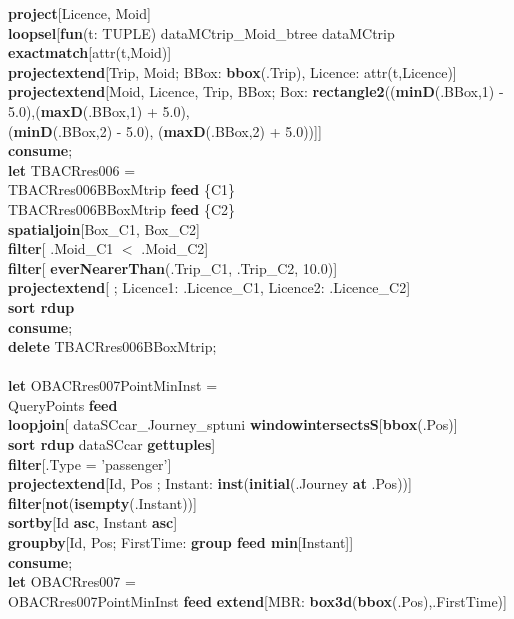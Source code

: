 \documentclass[a4paper]{article}
\newcommand{\op}[1]{\textbf{#1}}
\begin{document}
\begin{scriptsize}
\begin{tabbing}
\>\op{project}[Licence, Moid]\\
\>\op{loopsel}[\op{fun}(t: TUPLE) dataMCtrip\_Moid\_btree dataMCtrip \op{exactmatch}[attr(t,Moid)]\\
\>\>\op{projectextend}[Trip, Moid; BBox: \op{bbox}(.Trip), Licence: attr(t,Licence)]\\
\>\>\op{projectextend}[Moid, Licence, Trip, BBox; Box: \op{rectangle2}((\op{minD}(.BBox,1) - 5.0),(\op{maxD}(.BBox,1) + 5.0),\\
\>\>\>\>(\op{minD}(.BBox,2) - 5.0), (\op{maxD}(.BBox,2) + 5.0))]]\\
\op{consume};\\
\op{let} TBACRres006 =\\
\>TBACRres006BBoxMtrip \op{feed} \{C1\}\\
\>TBACRres006BBoxMtrip \op{feed} \{C2\}\\
\>\op{spatialjoin}[Box\_C1, Box\_C2]\\
\>\op{filter}[ .Moid\_C1 $<$ .Moid\_C2]\\
\>\op{filter}[ \op{everNearerThan}(.Trip\_C1, .Trip\_C2, 10.0)]\\
\>\op{projectextend}[ ; Licence1: .Licence\_C1, Licence2: .Licence\_C2]\\
\>\op{sort rdup}\\
\op{consume};\\
\op{delete} TBACRres006BBoxMtrip;\\
\\
\op{let} OBACRres007PointMinInst = \\
\>QueryPoints \op{feed}\\
\>\op{loopjoin}[ dataSCcar\_Journey\_sptuni \op{windowintersectsS}[\op{bbox}(.Pos)]\\
\>\>\op{sort rdup} dataSCcar \op{gettuples}]\\
\>\op{filter}[.Type = 'passenger']\\
\>\op{projectextend}[Id, Pos ; Instant: \op{inst}(\op{initial}(.Journey \op{at} .Pos))]\\
\>\op{filter}[\op{not}(\op{isempty}(.Instant))]\\
\>\op{sortby}[Id \op{asc}, Instant \op{asc}]\\
\>\op{groupby}[Id, Pos; FirstTime: \op{group feed min}[Instant]]\\
\op{consume};\\
\op{let} OBACRres007 =\\
\>OBACRres007PointMinInst \op{feed} \op{extend}[MBR: \op{box3d}(\op{bbox}(.Pos),.FirstTime)]\\

\end{tabbing}
\end{scriptsize}
\end{document}

